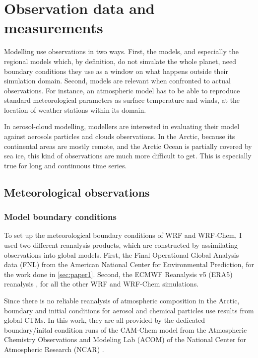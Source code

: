 \section{Observation data and measurements}
\label{sec:observation_data}
Modelling use observations in two ways. First, the models, and especially the regional models which, by definition, do not simulate the whole planet, need boundary conditions they use as a window on what happens outside their simulation domain.
Second, models are relevant when confronted to actual observations. For instance, an atmospheric model has to be able to reproduce standard meteorological parameters as surface temperature and winds, at the location of weather stations within its domain. %

In aerosol-cloud modelling, modellers are interested in evaluating their model against aerosols particles and clouds observations. 
In the Arctic, because its continental areas are mostly remote, and the Arctic Ocean is partially covered by sea ice, this kind of observations are much more difficult to get. 
This is especially true for long and continuous time series.

    \subsection{Meteorological observations}
    \label{sec:meteo_obs}
        \subsubsection{Model boundary conditions}
        To set up the meteorological boundary conditions of WRF and WRF-Chem, I used two different reanalysis products, which are constructed by assimilating observations into global models.
        First, the Final Operational Global Analysis data (FNL) from the American National Center for Environmental Prediction, for the work done in \cref{sec:paper1}. Second, the ECMWF Reanalysis v5 (ERA5) reanalysis \citep{copernicus_climate_change_service_c3s_era5_2017}, for all the other WRF and WRF-Chem simulations.

        Since there is no reliable reanalysis of atmospheric composition in the Arctic, boundary and initial conditions for aerosol and chemical particles use results from global CTMs. In this work, they are all provided by the dedicated boundary/inital condition runs of the CAM-Chem model from the Atmospheric Chemistry Observations and Modeling Lab (ACOM) of the National Center for Atmospheric Research (NCAR) \citep{buchholz_instantaneous_2019} .
    
